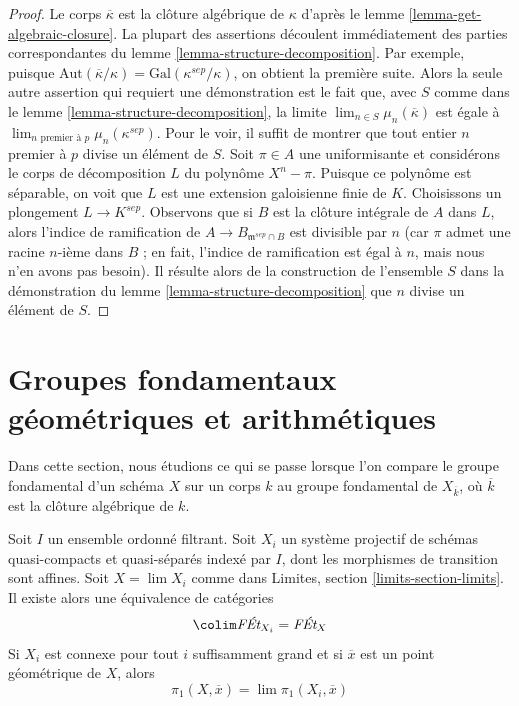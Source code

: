 \begin{proof}
Le corps $\overline{\kappa}$ est la clôture algébrique de $\kappa$ d'après le
lemme \ref{lemma-get-algebraic-closure}.
La plupart des assertions découlent immédiatement des parties correspondantes
du lemme \ref{lemma-structure-decomposition}. Par exemple, puisque
$\text{Aut}(\overline{\kappa}/\kappa) = \text{Gal}(\kappa^{sep}/\kappa)$,
on obtient la première suite.
Alors la seule autre assertion qui requiert une démonstration est le fait que,
avec $S$ comme dans le lemme \ref{lemma-structure-decomposition}, la
limite $\lim_{n \in S} \mu_n(\overline{\kappa})$ est égale à
$\lim_{n\text{ premier à }p} \mu_n(\kappa^{sep})$. Pour le voir,
il suffit de montrer que tout entier $n$ premier à $p$
divise un élément de $S$.
Soit $\pi \in A$ une uniformisante et considérons le corps de décomposition
$L$ du polynôme $X^n - \pi$. Puisque ce polynôme
est séparable, on voit que $L$ est une extension galoisienne finie de $K$.
Choisissons un plongement $L \to K^{sep}$.
Observons que si $B$ est la clôture intégrale de $A$ dans $L$,
alors l'indice de ramification de $A \to B_{\mathfrak m^{sep} \cap B}$
est divisible par $n$ (car $\pi$ admet une racine $n$-ième dans $B$ ; en fait,
l'indice de ramification est égal à $n$, mais nous n'en avons pas besoin).
Il résulte alors de la construction de l'ensemble $S$ dans la démonstration du
lemme \ref{lemma-structure-decomposition}
que $n$ divise un élément de $S$.
\end{proof}








\section{Groupes fondamentaux géométriques et arithmétiques}
\label{section-galois-action}

\noindent
Dans cette section, nous étudions ce qui se passe lorsque l'on compare le
groupe fondamental d'un schéma $X$ sur un corps $k$ au
groupe fondamental de $X_{\overline{k}}$, où $\overline{k}$
est la clôture algébrique de $k$.

\begin{lemma}
\label{lemma-limit}
Soit $I$ un ensemble ordonné filtrant. Soit $X_i$ un
système projectif de schémas quasi-compacts et quasi-séparés
indexé par $I$, dont les morphismes de transition sont affines.
Soit $X = \lim X_i$ comme dans Limites, section \ref{limits-section-limits}.
Il existe alors une équivalence de catégories
$$
\colim \textit{F\'Et}_{X_i} = \textit{F\'Et}_X
$$
Si $X_i$ est connexe pour tout $i$ suffisamment grand et si $\overline{x}$
est un point géométrique de $X$, alors
$$
\pi_1(X, \overline{x}) = \lim \pi_1(X_i, \overline{x})
$$
\end{lemma}

